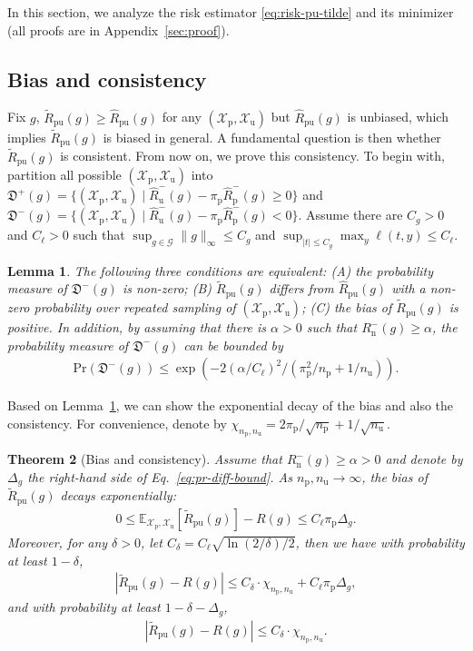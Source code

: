 \documentclass{article}
\newtheorem{theorem}{Theorem}
\newtheorem{lemma}[theorem]{Lemma}
\newcommand{\pr}{\mathrm{Pr}}
\newcommand{\bE}{\mathbb{E}}
\newcommand{\cG}{\mathcal{G}}
\newcommand{\cX}{\mathcal{X}}
\newcommand{\fD}{\mathfrak{D}}
\newcommand{\pip}{\pi_\mathrm{p}}
\newcommand{\Xp}{\cX_\mathrm{p}}
\newcommand{\Xu}{\cX_\mathrm{u}}
\newcommand{\Np}{{n_\mathrm{p}}}
\newcommand{\Nu}{{n_\mathrm{u}}}
\newcommand{\Rn}{R_\mathrm{n}}
\newcommand{\hRp}{\widehat{R}_\mathrm{p}}
\newcommand{\hRu}{\widehat{R}_\mathrm{u}}
\newcommand{\hRpu}{\widehat{R}_\mathrm{pu}}
\newcommand{\tRpu}{\widetilde{R}_\mathrm{pu}}
\begin{document}
In this section, we analyze the risk estimator \eqref{eq:risk-pu-tilde} and its minimizer (all proofs are in Appendix~\ref{sec:proof}).

\subsection{Bias and consistency}%

Fix $g$, $\tRpu(g)\ge\hRpu(g)$ for any $(\Xp,\Xu)$ but $\hRpu(g)$ is unbiased, which implies $\tRpu(g)$ is biased in general. A fundamental question is then whether $\tRpu(g)$ is consistent. From now on, we prove this consistency. To begin with, partition all possible $(\Xp,\Xu)$ into $\fD^+(g) = \{(\Xp,\Xu) \mid \hRu^-(g)-\pip\hRp^-(g)\ge0\}$ and $\fD^-(g) = \{(\Xp,\Xu) \mid \hRu^-(g)-\pip\hRp^-(g)<0\}$. Assume there are $C_g>0$ and $C_\ell>0$ such that $\sup_{g\in\cG}\|g\|_\infty\le C_g$ and $\sup_{|t|\le C_g}\max_y\ell(t,y)\le C_\ell$.

\begin{lemma}
  \label{thm:pr-diff}%
  The following three conditions are equivalent:
  (A) the probability measure of $\fD^-(g)$ is non-zero;
  (B) $\tRpu(g)$ differs from $\hRpu(g)$ with a non-zero probability over repeated sampling of $(\Xp,\Xu)$;
  (C) the bias of $\tRpu(g)$ is positive.
  In addition, by assuming that there is $\alpha>0$ such that $\Rn^-(g)\ge\alpha$, the probability measure of $\fD^-(g)$ can be bounded by
  \begin{align}
  \label{eq:pr-diff-bound}%
  \pr(\fD^-(g)) \le \exp( -2(\alpha/C_\ell)^2/(\pip^2/\Np+1/\Nu) ).
  \end{align}
\end{lemma}

Based on Lemma~\ref{thm:pr-diff}, we can show the exponential decay of the bias and also the consistency. For convenience, denote by $\chi_{\Np,\Nu}=2\pip/\sqrt{\Np}+1/\sqrt{\Nu}$.

\begin{theorem}[Bias and consistency]
  \label{thm:bias-consistency}%
  Assume that $\Rn^-(g)\ge\alpha>0$ and denote by $\Delta_g$ the right-hand side of Eq.~\eqref{eq:pr-diff-bound}. As $\Np,\Nu\to\infty$, the bias of $\tRpu(g)$ decays exponentially:
  \begin{align}
  \label{eq:bias-bound}%
  0 \le \bE_{\Xp,\Xu}[\tRpu(g)]-R(g) \le C_\ell\pip\Delta_g.
  \end{align}
  Moreover, for any $\delta>0$, let $C_\delta=C_\ell\sqrt{\ln(2/\delta)/2}$, then we have with probability at least $1-\delta$,
  \begin{align}
  \label{eq:dev-bound}%
  |\tRpu(g)-R(g)| \le C_\delta\cdot\chi_{\Np,\Nu}+C_\ell\pip\Delta_g,
  \end{align}
  and with probability at least $1-\delta-\Delta_g$,
  \begin{align}
  \label{eq:dev-bound-alter}%
  |\tRpu(g)-R(g)| \le C_\delta\cdot\chi_{\Np,\Nu}.
  \end{align}
\end{theorem}
\end{document}
